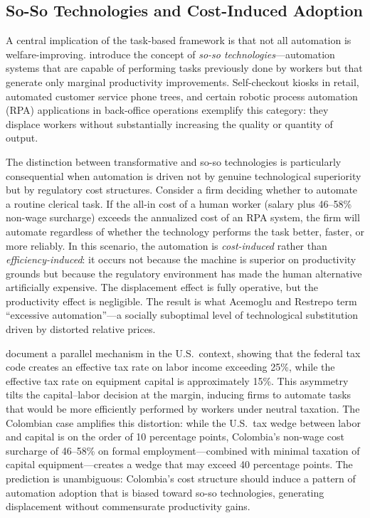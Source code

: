 \subsection{So-So Technologies and Cost-Induced Adoption}
\label{subsec:soso}

A central implication of the task-based framework is that not all automation is welfare-improving. \cite{acemoglu2019automation} introduce the concept of \textit{so-so technologies}---automation systems that are capable of performing tasks previously done by workers but that generate only marginal productivity improvements. Self-checkout kiosks in retail, automated customer service phone trees, and certain robotic process automation (RPA) applications in back-office operations exemplify this category: they displace workers without substantially increasing the quality or quantity of output.

The distinction between transformative and so-so technologies is particularly consequential when automation is driven not by genuine technological superiority but by regulatory cost structures. Consider a firm deciding whether to automate a routine clerical task. If the all-in cost of a human worker (salary plus 46--58\% non-wage surcharge) exceeds the annualized cost of an RPA system, the firm will automate regardless of whether the technology performs the task better, faster, or more reliably. In this scenario, the automation is \textit{cost-induced} rather than \textit{efficiency-induced}: it occurs not because the machine is superior on productivity grounds but because the regulatory environment has made the human alternative artificially expensive. The displacement effect is fully operative, but the productivity effect is negligible. The result is what Acemoglu and Restrepo term ``excessive automation''---a socially suboptimal level of technological substitution driven by distorted relative prices.

\cite{acemoglu2020taxes} document a parallel mechanism in the U.S.\ context, showing that the federal tax code creates an effective tax rate on labor income exceeding 25\%, while the effective tax rate on equipment capital is approximately 15\%. This asymmetry tilts the capital--labor decision at the margin, inducing firms to automate tasks that would be more efficiently performed by workers under neutral taxation. The Colombian case amplifies this distortion: while the U.S.\ tax wedge between labor and capital is on the order of 10 percentage points, Colombia's non-wage cost surcharge of 46--58\% on formal employment---combined with minimal taxation of capital equipment---creates a wedge that may exceed 40 percentage points. The prediction is unambiguous: Colombia's cost structure should induce a pattern of automation adoption that is biased toward so-so technologies, generating displacement without commensurate productivity gains.


